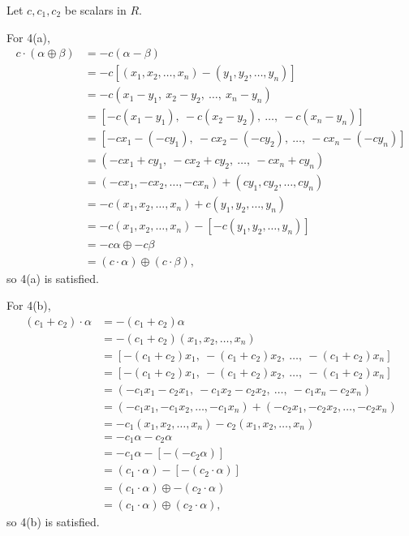 \documentclass[12pt]{article}
\begin{document}
\begin{enumerate}
    Let $c,c_1,c_2$ be scalars in $R$.

    For 4(a),
    \begin{align*}
      c \cdot (\alpha \oplus \beta) &= -c(\alpha - \beta)\\
      &= -c[(x_1,x_2,\ldots,x_n) - (y_1,y_2,\ldots,y_n)]\\
      &= -c(x_1-y_1,\ x_2-y_2,\ \ldots,\ x_n-y_n)\\
      &= [-c(x_1-y_1),\ -c(x_2-y_2),\ \ldots,\ -c(x_n-y_n)]\\
      &= [-cx_1-(-cy_1),\ -cx_2-(-cy_2),\ \ldots,\ -cx_n-(-cy_n)]\\
      &= (-cx_1+cy_1,\ -cx_2+cy_2,\ \ldots,\ -cx_n+cy_n)\\
      &= (-cx_1,-cx_2,\ldots,-cx_n) + (cy_1,cy_2,\ldots,cy_n)\\
      &= -c(x_1,x_2,\ldots,x_n) + c(y_1,y_2,\ldots,y_n)\\
      &= -c(x_1,x_2,\ldots,x_n) - [-c(y_1,y_2,\ldots,y_n)]\\
      &= -c\alpha \oplus -c\beta\\
      &= (c \cdot \alpha) \oplus (c \cdot \beta),
    \end{align*}
    so 4(a) is satisfied.

    For 4(b),
    \begin{align*}
      (c_1 + c_2) \cdot \alpha &= -(c_1 + c_2)\alpha\\
      &= -(c_1 + c_2)(x_1,x_2,\ldots,x_n)\\
      &= [-(c_1 + c_2)x_1,\ -(c_1 + c_2)x_2,\ \ldots,\ -(c_1 + c_2)x_n]\\
      &= [-(c_1 + c_2)x_1,\ -(c_1 + c_2)x_2,\ \ldots,\ -(c_1 + c_2)x_n]\\
      &= (-c_1x_1 - c_2x_1,\ -c_1x_2 - c_2x_2,\ \ldots,\ -c_1x_n - c_2x_n)\\
      &= (-c_1x_1,-c_1x_2,\ldots,-c_1x_n) + (-c_2x_1,-c_2x_2,\ldots,-c_2x_n)\\
      &= -c_1(x_1,x_2,\ldots,x_n) - c_2(x_1,x_2,\ldots,x_n)\\
      &= -c_1\alpha - c_2\alpha\\
      &= -c_1\alpha - [-(-c_2\alpha)]\\
      &= (c_1 \cdot \alpha) - [-(c_2 \cdot \alpha)]\\
      &= (c_1 \cdot \alpha) \oplus -(c_2 \cdot \alpha)\\
      &= (c_1 \cdot \alpha) \oplus (c_2 \cdot \alpha),
    \end{align*}
    so 4(b) is satisfied.


\end{enumerate}
\end{document}

